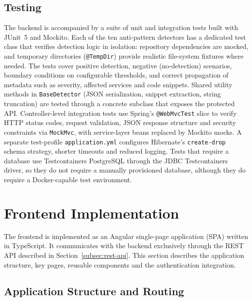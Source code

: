 \subsection{Testing}
\label{subsec:testing}

\par The backend is accompanied by a suite of unit and integration tests built with JUnit~5 and Mockito. Each of the ten anti-pattern detectors has a dedicated test class that verifies detection logic in isolation: repository dependencies are mocked, and temporary directories (\texttt{@TempDir}) provide realistic file-system fixtures where needed. The tests cover positive detection, negative (no-detection) scenarios, boundary conditions on configurable thresholds, and correct propagation of metadata such as severity, affected services and code snippets. Shared utility methods in \texttt{BaseDetector} (JSON serialization, snippet extraction, string truncation) are tested through a concrete subclass that exposes the protected API. Controller-level integration tests use Spring's \texttt{@WebMvcTest} slice to verify HTTP status codes, request validation, JSON response structure and security constraints via \texttt{MockMvc}, with service-layer beans replaced by Mockito mocks. A separate test-profile \texttt{application.yml} configures Hibernate's \texttt{create-drop} schema strategy, shorter timeouts and reduced logging. Tests that require a database use Testcontainers PostgreSQL through the JDBC Testcontainers driver, so they do not require a manually provisioned database, although they do require a Docker-capable test environment.


\section{Frontend Implementation}
\label{sec:frontend-impl}

 \par The frontend is implemented as an Angular single-page application (SPA) written in TypeScript. It communicates with the backend exclusively through the REST API described in Section~\ref{subsec:rest-api}. This section describes the application structure, key pages, reusable components and the authentication integration.

\subsection{Application Structure and Routing}
\label{subsec:frontend-structure}

